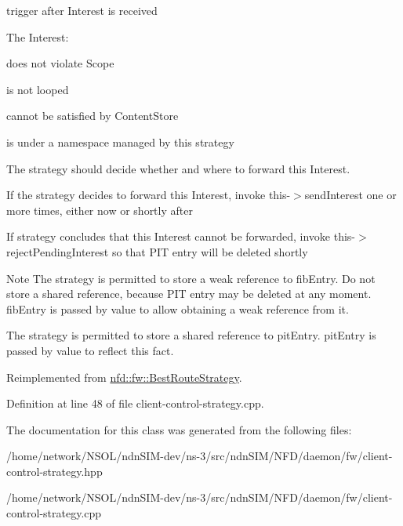 trigger after Interest is received 

The Interest\+:
\begin{DoxyItemize}
\item does not violate Scope
\item is not looped
\item cannot be satisfied by Content\+Store
\item is under a namespace managed by this strategy
\end{DoxyItemize}

The strategy should decide whether and where to forward this Interest.
\begin{DoxyItemize}
\item If the strategy decides to forward this Interest, invoke this-\/$>$send\+Interest one or more times, either now or shortly after
\item If strategy concludes that this Interest cannot be forwarded, invoke this-\/$>$reject\+Pending\+Interest so that P\+IT entry will be deleted shortly
\end{DoxyItemize}

\begin{DoxyNote}{Note}
The strategy is permitted to store a weak reference to fib\+Entry. Do not store a shared reference, because P\+IT entry may be deleted at any moment. fib\+Entry is passed by value to allow obtaining a weak reference from it. 

The strategy is permitted to store a shared reference to pit\+Entry. pit\+Entry is passed by value to reflect this fact. 
\end{DoxyNote}


Reimplemented from \hyperlink{classnfd_1_1fw_1_1BestRouteStrategy_a85bc7a6cf35dd45793c616e89182b298}{nfd\+::fw\+::\+Best\+Route\+Strategy}.



Definition at line 48 of file client-\/control-\/strategy.\+cpp.



The documentation for this class was generated from the following files\+:\begin{DoxyCompactItemize}
\item 
/home/network/\+N\+S\+O\+L/ndn\+S\+I\+M-\/dev/ns-\/3/src/ndn\+S\+I\+M/\+N\+F\+D/daemon/fw/client-\/control-\/strategy.\+hpp\item 
/home/network/\+N\+S\+O\+L/ndn\+S\+I\+M-\/dev/ns-\/3/src/ndn\+S\+I\+M/\+N\+F\+D/daemon/fw/client-\/control-\/strategy.\+cpp\end{DoxyCompactItemize}
